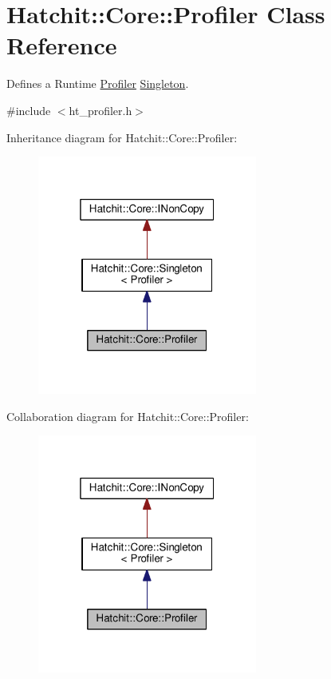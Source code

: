 \hypertarget{classHatchit_1_1Core_1_1Profiler}{}\section{Hatchit\+:\+:Core\+:\+:Profiler Class Reference}
\label{classHatchit_1_1Core_1_1Profiler}


Defines a Runtime \hyperlink{classHatchit_1_1Core_1_1Profiler}{Profiler} \hyperlink{classHatchit_1_1Core_1_1Singleton}{Singleton}.  




{\ttfamily \#include $<$ht\+\_\+profiler.\+h$>$}



Inheritance diagram for Hatchit\+:\+:Core\+:\+:Profiler\+:
\nopagebreak
\begin{figure}[H]
\begin{center}
\leavevmode
\includegraphics[width=205pt]{classHatchit_1_1Core_1_1Profiler__inherit__graph}
\end{center}
\end{figure}


Collaboration diagram for Hatchit\+:\+:Core\+:\+:Profiler\+:
\nopagebreak
\begin{figure}[H]
\begin{center}
\leavevmode
\includegraphics[width=205pt]{classHatchit_1_1Core_1_1Profiler__coll__graph}
\end{center}
\end{figure}
